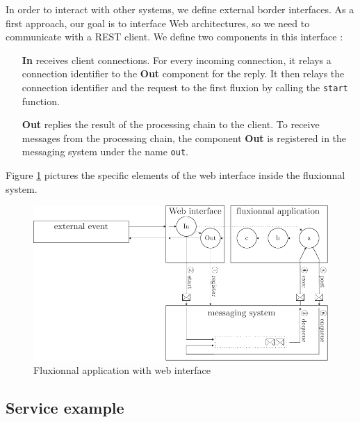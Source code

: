 In order to interact with other systems, we define external border interfaces.
As a first approach, our goal is to interface Web architectures, so we need to communicate with a REST\cite{Fielding2002} client.
We define two components in this interface :

\begin{itemize}
	\item[\textbf{In}]
    receives client connections.
    For every incoming connection, it relays a connection identifier to the \textbf{Out} component for the reply.
    It then relays the connection identifier and the request to the first fluxion by calling the \texttt{start} function.
	\item[\textbf{Out}]
    replies the result of the processing chain to the client.
    To receive messages from the processing chain, the component \textbf{Out} is registered in the messaging system under the name \texttt{out}.
\end{itemize}

Figure \ref{fig:schemaweb} pictures the specific elements of the web interface inside the fluxionnal system.

\begin{figure}[h!]
	\includegraphics[width=\linewidth]{schema-web.pdf}
	\caption{Fluxionnal application with web interface}
	\label{fig:schemaweb}
\end{figure}


\subsection{Service example}

